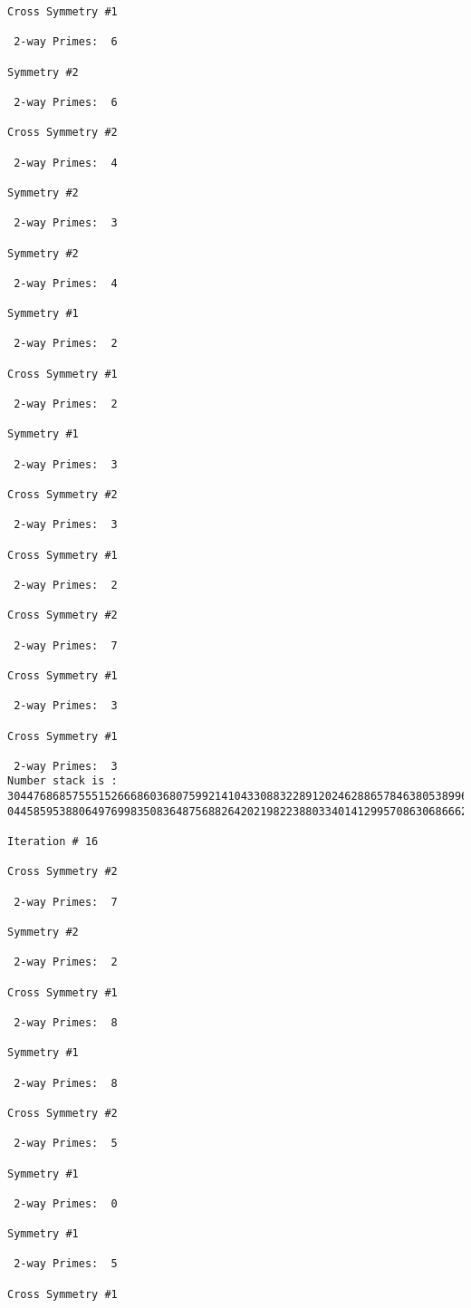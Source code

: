 {{{{\begin{verbatim}
Cross Symmetry #1

 2-way Primes: 	6

Symmetry #2

 2-way Primes: 	6

Cross Symmetry #2

 2-way Primes: 	4

Symmetry #2

 2-way Primes: 	3

Symmetry #2

 2-way Primes: 	4

Symmetry #1

 2-way Primes: 	2

Cross Symmetry #1

 2-way Primes: 	2

Symmetry #1

 2-way Primes: 	3

Cross Symmetry #2

 2-way Primes: 	3

Cross Symmetry #1

 2-way Primes: 	2

Cross Symmetry #2

 2-way Primes: 	7

Cross Symmetry #1

 2-way Primes: 	3

Cross Symmetry #1

 2-way Primes: 	3
Number stack is :
30447686857555152666860368075992141043308832289120246288657846380538996794608835958544046240163340857
04458595388064976998350836487568826420219822388033401412995708630686662515557586867440375804336104264

Iteration #	16

Cross Symmetry #2

 2-way Primes: 	7

Symmetry #2

 2-way Primes: 	2

Cross Symmetry #1

 2-way Primes: 	8

Symmetry #1

 2-way Primes: 	8

Cross Symmetry #2

 2-way Primes: 	5

Symmetry #1

 2-way Primes: 	0

Symmetry #1

 2-way Primes: 	5

Cross Symmetry #1


\end{verbatim}}}}}
